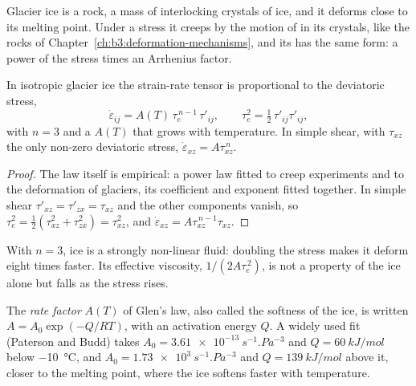 Glacier ice is a rock, a mass of interlocking crystals of ice, and it
deforms close to its melting point. Under a stress it creeps by the
motion of  in its crystals, like the rocks of
Chapter~\ref{ch:b3:deformation-mechanisms}, and its  has the same
form: a power of the stress times an Arrhenius factor.

\begin{theorem}\label{thm:b3:glaciology:glen}
In isotropic glacier ice the strain-rate tensor is proportional to the
deviatoric stress,
\[
\dot\varepsilon_{ij} = A(T)\,\tau_e^{\,n-1}\,\tau'_{ij}, \qquad
\tau_e^2 = \tfrac12\,\tau'_{ij}\tau'_{ij},
\]
with $n = 3$ and a  $A(T)$ that grows with temperature. In
simple shear, with $\tau_{xz}$ the only non-zero deviatoric stress,
$\dot\varepsilon_{xz} = A\tau_{xz}^{\,n}$.
\end{theorem}

\begin{proof}
The law itself is empirical: a power law fitted to creep experiments and
to the deformation of glaciers, its coefficient and exponent fitted
together. In simple shear $\tau'_{xz} = \tau'_{zx} = \tau_{xz}$ and the
other components vanish, so $\tau_e^2 = \tfrac12(\tau_{xz}^2 +
\tau_{zx}^2) = \tau_{xz}^2$, and $\dot\varepsilon_{xz} = A\tau_{xz}^{\,n-1}
\tau_{xz}$.
\end{proof}

With $n = 3$, ice is a strongly non-linear fluid: doubling the stress makes
it deform eight times faster. Its effective viscosity, $1/(2A\tau_e^{\,2})$,
is not a property of the ice alone but falls as the stress rises.

\begin{definition}\label{def:b3:glaciology:glen}
The \emph{rate factor} $A(T)$ of Glen's law, also
called the softness of the ice, is written $A = A_0\exp(-Q/RT)$, with an
activation energy $Q$. A widely used fit (Paterson and Budd) takes $A_0 =
\qty{3.61e-13}{s^{-1}.Pa^{-3}}$ and $Q = \qty{60}{kJ/mol}$ below
\qty{-10}{\celsius}, and $A_0 = \qty{1.73e3}{s^{-1}.Pa^{-3}}$ and $Q =
\qty{139}{kJ/mol}$ above it, closer to the melting point, where the ice
softens faster with temperature.
\end{definition}

